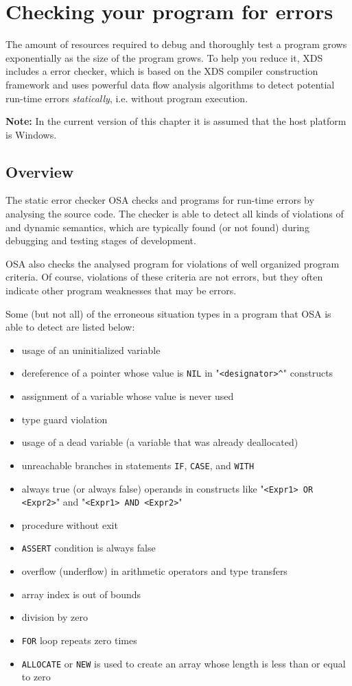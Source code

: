 \chapter{Checking your program for errors}
\label{osa}

The amount of resources required to debug and thoroughly test a program
grows exponentially as the size of the program grows.
To help you reduce it, XDS includes a error checker, which is based 
on the XDS compiler construction framework and uses powerful data flow 
analysis algorithms to detect potential run-time errors {\em statically}, 
i.e. without program execution.

{\bf Note:} In the current version of this chapter it is assumed that the host 
platform is Windows.


\section{Overview}
\label{osa:overview}

The static error checker OSA checks \ot{} and \mt{} programs for run-time 
errors by analysing the source code. The checker is able to detect
all kinds of violations of \mt{} and \ot{} dynamic semantics,
which are typically found (or not found) during debugging and testing stages
of development.

OSA also checks the analysed program for violations of well organized 
program criteria. Of course, violations of these criteria are not errors,
but they often indicate other program weaknesses that may be errors. 

Some (but not all) of the erroneous situation types in a program that OSA
is able to detect are listed below:
\begin{itemize}
\item usage of an uninitialized variable 
\item dereference of a pointer whose value is \verb'NIL' in
      "\verb'<designator>^'" constructs
\item assignment of a variable whose value is never used
\item type guard violation
\item usage of a dead variable (a variable that was already deallocated)
\item unreachable branches in statements \verb'IF', \verb'CASE', and \ot{} 
      \verb'WITH'
\item always true (or always false) operands in constructs like
      "\verb'<Expr1> OR <Expr2>'" and "\verb'<Expr1> AND <Expr2>'"
\item procedure without exit
\item \verb'ASSERT' condition is always false
\item overflow (underflow) in arithmetic operators and type
      transfers
\item array index is out of bounds
\item division by zero
\item \verb'FOR' loop repeats zero times
\item \verb'ALLOCATE' or \verb'NEW' is used to create an array whose length is 
      less than or equal to zero
\end{itemize}

